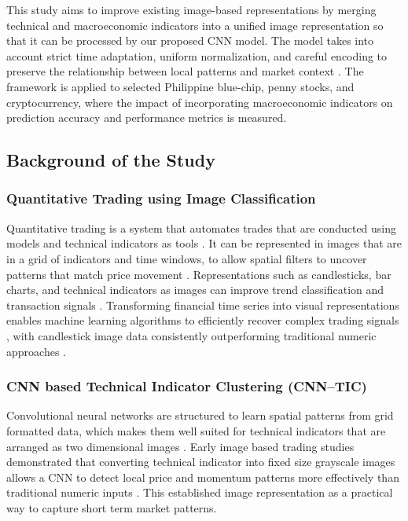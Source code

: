 \documentclass[12pt,a4paper]{article}
\begin{document}
This study aims to improve existing image-based representations by merging technical and macroeconomic indicators into a unified image representation so that it can be processed by our proposed CNN model. 
The model takes into account strict time adaptation, uniform normalization, and careful encoding to preserve the relationship between local patterns and market context \cite{sezer2018algorithmic,maratkhan2021deep}. 
The framework is applied to selected Philippine blue-chip, penny stocks, and cryptocurrency, where the impact of incorporating macroeconomic indicators on prediction accuracy and performance metrics is measured.

\subsection{Background of the Study}
	\subsubsection*{Quantitative Trading using Image Classification}
	Quantitative trading is a system that automates trades that are conducted using models and technical indicators as tools \cite{ta2018prediction}. It can be represented in images that are in a grid of indicators and time windows, to allow spatial filters to uncover patterns that match price movement \cite{cohen2020trading,sezer2018algorithmic}. Representations such as candlesticks, bar charts, and technical indicators as images can improve trend classification and transaction signals \cite{gudelek2017deep,chen2020encoding,liu2023automated}. Transforming financial time series into visual representations enables machine learning algorithms to efficiently recover complex trading signals \cite{cohen2020trading}, with candlestick image data consistently outperforming traditional numeric approaches \cite{liu2023automated}. 


	\subsubsection*{CNN based Technical Indicator Clustering (CNN--TIC)}
	Convolutional neural networks are structured to learn spatial patterns from grid formatted data, which makes them well suited for technical indicators that are arranged as two dimensional images \cite{al2017understanding,lecun1995learning}. Early image based trading studies demonstrated that converting technical indicator into fixed size grayscale images allows a CNN to detect local price and momentum patterns more effectively than traditional numeric inputs \cite{sezer2018algorithmic}. This established image representation as a practical way to capture short term market patterns.
	
\end{document}
